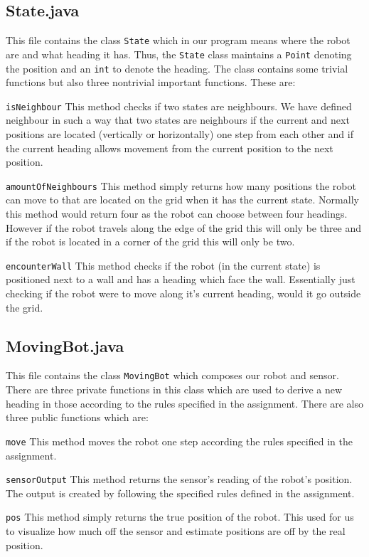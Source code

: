 \documentclass[a4paper]{article}
\begin{document}
\subsection{State.java}
This file contains the class \texttt{State} which in our program means where the robot are and what heading it has. Thus, the \texttt{State} class maintains a \texttt{Point} denoting the position and an \texttt{int} to denote the heading. The class contains some trivial functions but also three nontrivial important functions. These are:
\begin{description}
\item{\texttt{isNeighbour}} This method checks if two states are neighbours. We have defined neighbour in such a way that two states are neighbours if the current and next positions are located (vertically or horizontally) one step from each other and if the current heading allows movement from the current position to the next position.
\item{\texttt{amountOfNeighbours}} This method simply returns how many positions the robot can move to that are located on the grid when it has the current state. Normally this method would return four as the robot can choose between four headings. However if the robot travels along the edge of the grid this will only be three and if the robot is located in a corner of the grid this will only be two.
\item{\texttt{encounterWall}} This method checks if the robot (in the current state) is positioned next to a wall and has a heading which face the wall. Essentially just checking if the robot were to move along it's current heading, would it go outside the grid.
\end{description}
\subsection{MovingBot.java}
This file contains the class \texttt{MovingBot} which composes our robot and sensor. There are three private functions in this class which are used to derive a new heading in those according to the rules specified in the assignment. There are also three public functions which are:
\begin{description}
\item{\texttt{move}} This method moves the robot one step according the rules specified in the assignment.
\item{\texttt{sensorOutput}} This method returns the sensor's reading of the robot's position. The output is created by following the specified rules defined in the assignment.
\item{\texttt{pos}} This method simply returns the true position of the robot. This used for us to visualize how much off the sensor and estimate positions are off by the real position.
\end{description}
\end{document}
